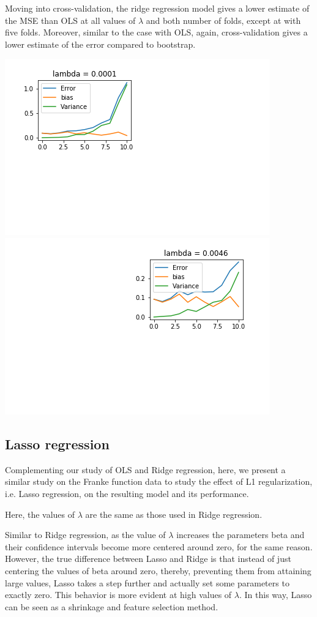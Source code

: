 \documentclass{article}
\begin{document}
Moving into cross-validation, the ridge regression model gives a lower estimate of the MSE than OLS at all values of $\lambda$ and both number of folds, except at  with five folds. Moreover, similar to the case with OLS, again, cross-validation gives a lower estimate of the error compared to bootstrap.

\includegraphics[scale=1]{boostrapridge0.png}
\includegraphics[scale=1]{boostrapridge1.png}

\subsection{Lasso regression}
Complementing our study of OLS and Ridge regression, here, we present a similar study on the Franke function data to study the effect of L1 regularization, i.e. Lasso regression, on the resulting model and its performance.

Here, the values of $\lambda$ are the same as those used in Ridge regression.

Similar to Ridge regression, as the value of $\lambda$ increases the parameters beta and their confidence intervals become more centered around zero, for the same reason. However, the true difference between Lasso and Ridge is that instead of just centering the values of beta around zero, thereby, preventing them from attaining large values, Lasso takes a step further and actually set some parameters to exactly zero. This behavior is more evident at high values of $\lambda$. In this way, Lasso can be seen as a shrinkage and feature selection method.
\end{document}
